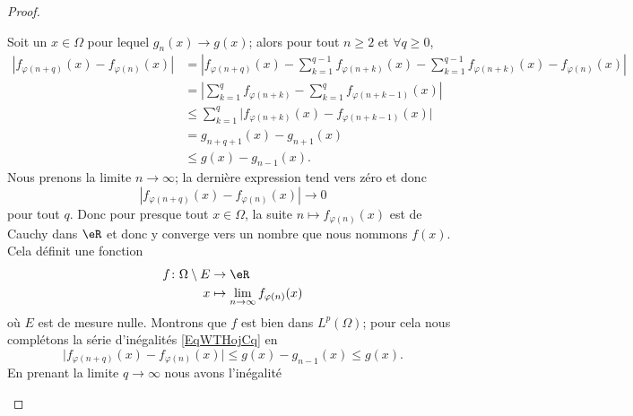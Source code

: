 \begin{proof}
\begin{subproof}
		Soit un \( x\in \Omega\) pour lequel \( g_n(x)\to g(x)\); alors pour tout \( n\geq 2\) et \( \forall q\geq 0\),
		\begin{subequations}    \label{EqWTHojCq}
			\begin{align}
				| f_{\varphi(n+q)}(x)-f_{\varphi(n)}(x) | & =\left| f_{\varphi(n+q)}(x)-\sum_{k=1}^{q-1}f_{\varphi(n+k)}(x) -\sum_{k=1}^{q-1}f_{\varphi(n+k)}(x)-f_{\varphi(n)}(x) \right| \\
				                                          & =\left| \sum_{k=1}^qf_{\varphi(n+k)}-\sum_{k=1}^qf_{\varphi(n+k-1)}(x) \right|                                                 \\
				                                          & \leq \sum_{k=1}^q\Big| f_{\varphi(n+k)}(x)-f_{\varphi(n+k-1)}(x) \Big|                                                         \\
				                                          & =g_{n+q+1}(x)-g_{n+1}(x)                                                                                                       \\
				                                          & \leq g(x)-g_{n-1}(x).
			\end{align}
		\end{subequations}
		Nous prenons la limite \( n\to \infty\); la dernière expression tend vers zéro et donc
		\begin{equation}
			| f_{\varphi(n+q)}(x)-f_{\varphi(n)}(x) |\to 0
		\end{equation}
		pour tout \( q\). Donc pour presque tout \( x\in \Omega\), la suite \( n\mapsto f_{\varphi(n)}(x)\) est de Cauchy dans \( \eR\) et donc y converge vers un nombre que nous nommons \( f(x)\). Cela définit une fonction
		\begin{equation}
			\begin{aligned}
				f\colon \Omega\setminus E & \to \eR                                      \\
				x                         & \mapsto \lim_{n\to \infty} f_{\varphi(n)}(x)
			\end{aligned}
		\end{equation}
		où \( E\) est de mesure nulle. Montrons que \( f\) est bien dans \( L^p(\Omega)\); pour cela nous complétons la série d'inégalités \eqref{EqWTHojCq} en
		\begin{equation}
			\big| f_{\varphi(n+q)}(x)-f_{\varphi(n)}(x) \big|\leq g(x)-g_{n-1}(x)\leq g(x).
		\end{equation}
		En prenant la limite \( q\to \infty\) nous avons l'inégalité

\end{subproof}
\end{proof}
